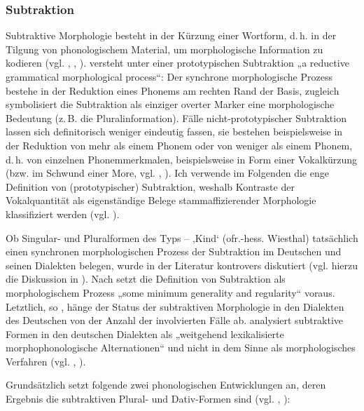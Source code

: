 \subsubsection{Subtraktion}
\label{sec:7.1.2.4}
Subtraktive Morphologie besteht in der Kürzung einer Wortform, d.\,h. in der Tilgung von phonologischem Material, um morphologische Information zu kodieren (vgl. \citealt[21]{Birkenes2014}, \citealt[581]{Dressler2000}, \citealt[143]{GolstonWiese1996}). \citet[582]{Dressler2000} versteht unter einer prototypischen Subtraktion „a reductive grammatical morphological process“: Der synchrone morphologische Prozess bestehe in der Reduktion eines Phonems am rechten Rand der Basis, zugleich symbolisiert die Subtraktion als einziger overter Marker eine morphologische Bedeutung (z.\,B. die Pluralinformation). Fälle nicht-prototypischer Subtraktion lassen sich definitorisch weniger eindeutig fassen, sie bestehen beispielsweise in der Reduktion von mehr als einem Phonem oder von weniger als einem Phonem, d.\,h. von einzelnen Phonemmerkmalen, beispielsweise in Form einer Vokalkürzung (bzw. im Schwund einer More, vgl. \citealt[25]{Birkenes2014}, \citealt[582]{Dressler2000}). Ich verwende im Folgenden die enge Definition von (prototypischer) Subtraktion, weshalb Kontraste der Vokalquantität als eigenständige Belege stammaffizierender Morphologie klassifiziert werden (vgl. ).

Ob Singular- und Pluralformen des Typs  --  ‚Kind‘ (ofr.-hess. Wiesthal) tatsächlich einen synchronen morphologischen Prozess der Subtraktion im Deutschen und seinen Dialekten belegen, wurde in der Literatur kontrovers diskutiert (vgl. hierzu die Diskussion in \citealt[31--33]{Birkenes2014}). Nach \citet[582]{Dressler2000} setzt die Definition von Subtraktion als morphologischem Prozess „some minimum generality and regularity“ voraus. Letztlich, so \citet[583]{Dressler2000}, hänge der Status der subtraktiven Morphologie in den Dialekten des Deutschen von der Anzahl der involvierten Fälle ab. \citet[23]{Birkenes2014} analysiert subtraktive Formen in den deutschen Dialekten als „weitgehend lexikalisierte morphophonologische Alternationen“ und nicht in dem Sinne als morphologisches Verfahren (vgl. \citealt[184]{Birkenes2014}, \citealt[47]{Haas1988}).

Grundsätzlich setzt \citet[32]{Birkenes2014} folgende zwei phonologischen Entwicklungen an, deren Ergebnis die subtraktiven Plural- und Dativ-Formen sind (vgl. \citealt[47]{Haas1988}, \citealt[14]{Köhler1934}):


